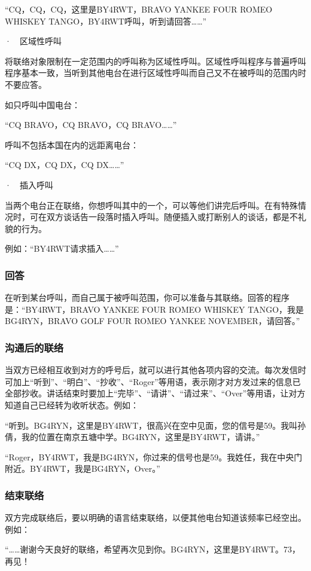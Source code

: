 \documentclass[12pt,UTF8]{ctexbook}
\begin{document}
“CQ，CQ，CQ，这里是BY4RWT，BRAVO YANKEE FOUR ROMEO WHISKEY TANGO，BY4RWT呼叫，听到请回答……”

·　区域性呼叫

将联络对象限制在一定范围内的呼叫称为区域性呼叫。区域性呼叫程序与普遍呼叫程序基本一致，当听到其他电台在进行区域性呼叫而自己又不在被呼叫的范围内时不要应答。

如只呼叫中国电台：

“CQ BRAVO，CQ BRAVO，CQ BRAVO……”

呼叫不包括本国在内的远距离电台：

“CQ DX，CQ DX，CQ DX……”

·　插入呼叫

当两个电台正在联络，你想呼叫其中的一个，可以等他们讲完后呼叫。在有特殊情况时，可在双方谈话告一段落时插入呼叫。随便插入或打断别人的谈话，都是不礼貌的行为。

例如：“BY4RWT请求插入……”

\subsubsection{回答}

在听到某台呼叫，而自己属于被呼叫范围，你可以准备与其联络。回答的程序是：“BY4RWT，BRAVO YANKEE FOUR ROMEO WHISKEY TANGO，我是BG4RYN，BRAVO GOLF FOUR ROMEO YANKEE NOVEMBER，请回答。”

\subsubsection{沟通后的联络}

当双方已经相互收到对方的呼号后，就可以进行其他各项内容的交流。每次发信时可加上“听到”、“明白”、“抄收”、“Roger”等用语，表示刚才对方发过来的信息已全部抄收。讲话结束时要加上“完毕”、“请讲”、“请过来”、“Over”等用语，让对方知道自己已经转为收听状态。例如：

“听到。BG4RYN，这里是BY4RWT，很高兴在空中见面，您的信号是59。我叫孙倩，我的位置在南京五塘中学。BG4RYN，这里是BY4RWT，请讲。”

“Roger，BY4RWT，我是BG4RYN，你过来的信号也是59。我姓任，我在中央门附近。BY4RWT，我是BG4RYN，Over。”

\subsubsection{结束联络}

双方完成联络后，要以明确的语言结束联络，以便其他电台知道该频率已经空出。例如：

“……谢谢今天良好的联络，希望再次见到你。BG4RYN，这里是BY4RWT。73，再见！
\end{document}
